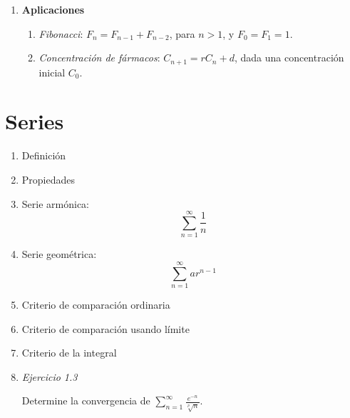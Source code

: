 \documentclass[12pt,oneside]{book}
\begin{document}
\begin{enumerate}
\vspace{200pt}


\item \textbf{Aplicaciones}

\begin{enumerate}
 \item \textit{Fibonacci}: $F_{n}=F_{n-1}+F_{n-2}$, para $n > 1$, y $F_{0}=F_{1}=1$.

 \vspace{40pt}


\item \textit{Concentración de fármacos}: $C_{n+1}=rC_{n}+d$, dada una concentración inicial $C_{0}$.
 
\end{enumerate}




\end{enumerate}

\newpage

\section{Series}

\begin{enumerate}
 \item Definición
 
 \vspace{120pt}
 
 
 \item Propiedades
 
 \vspace{120pt}
 
 
 \item Serie armónica: \[\sum_{n=1}^{\infty}\frac{1}{n}\]
 
 \vspace{120pt}
 
 
 \item Serie geométrica: $$\sum_{n=1}^{\infty}ar^{n-1}$$
 
 \newpage
 
 
 \item Criterio de comparación ordinaria
 
  \vspace{100pt}
 
 
 \item Criterio de comparación usando límite

   \vspace{120pt}
 
 
 \item Criterio de la integral
 
   \vspace{120pt}
 
 
 \item \textit{Ejercicio 1.3}
 
 Determine la convergencia de $\displaystyle \sum_{n=1}^{\infty}\frac{e^{-n}}{\sqrt[p]{n}}$.
 

 
\end{enumerate}


    
\end{document}
